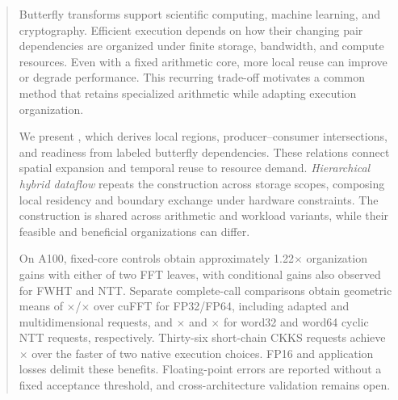 \begin{abstract}
Butterfly transforms support scientific computing, machine learning, and
cryptography. Efficient execution depends on how their changing pair
dependencies are organized under finite storage, bandwidth, and compute
resources. Even with a fixed arithmetic core, more local reuse can improve
or degrade performance. This recurring trade-off motivates a common method
that retains specialized arithmetic while adapting execution organization.

We present \system{}, which derives local regions, producer--consumer
intersections, and readiness from labeled butterfly dependencies. These
relations connect spatial expansion and temporal reuse to resource demand.
\emph{Hierarchical hybrid dataflow} repeats the construction across storage
scopes, composing local residency and boundary exchange under hardware
constraints. The construction is shared across arithmetic and workload
variants, while their feasible and beneficial organizations can differ.

On A100, fixed-core controls obtain approximately 1.22$\times$ organization
gains with either of two FFT leaves, with conditional gains also observed
for FWHT and NTT. Separate complete-call comparisons obtain geometric means
of \CurrentFFTSingle$\times$/\CurrentFFTDouble$\times$ over cuFFT for FP32/FP64,
including adapted and multidimensional requests, and \CurrentCyclicNTTWordThirtyTwo$\times$
and \CurrentCyclicNTTWordSixtyFour$\times$ for word32 and word64 cyclic NTT requests,
respectively. Thirty-six short-chain CKKS requests
achieve \CurrentCKKSFast$\times$ over the faster of two native execution choices.
FP16 and application losses delimit these benefits. Floating-point errors are
reported without a fixed acceptance threshold, and cross-architecture
validation remains open.
\end{abstract}
